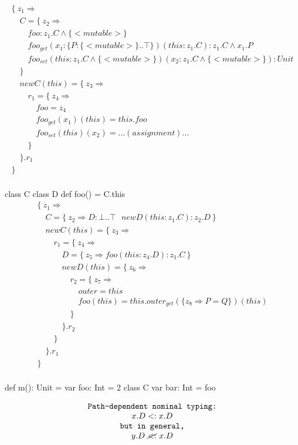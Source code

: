 \begin{equation*}
\begin{array}{l}
\{\ z_1 \Rightarrow \\
\quad C = \{\ z_2 \Rightarrow \\
\quad \quad foo: z_1.C \land \{<mutable>\} \\
\quad \quad foo_{get}(x_1: \{ P: \{<mutable>\}..\top \})(this: z_1.C): z_1.C \land x_1.P \\
\quad \quad foo_{set}(this: z_1.C \land \{<mutable>\})(x_2: z_1.C \land \{<mutable>\}): Unit \\
\quad \} \\
\quad newC(this) = \{\ z_3 \Rightarrow \\
\quad \quad r_1 = \{\ z_4 \Rightarrow \\
\quad \quad \quad foo = z_4 \\
\quad \quad \quad foo_{get}(x_1)(this) = this.foo \\
\quad \quad \quad foo_{set}(this)(x_2) = ...(assignment)... \\
\quad \quad \} \\
\quad \}.r_1 \\
\} \\
\end{array}
\end{equation*}



class C {
  class D { def foo() = C.this }
}
\begin{equation*}
\begin{array}{l}
\{\ z_1 \Rightarrow \\
\quad C = \{\ z_2 \Rightarrow D:\bot..\top \ \ \ newD(this:z_1.C): z_2.D\ \} \\
\quad newC(this) = \{\ z_3 \Rightarrow \\
\quad \quad r_1 = \{\ z_4 \Rightarrow \\
\quad \quad \quad D = \{\ z_5 \Rightarrow foo(this:z_4.D):z_1.C \ \} \\
\quad \quad \quad newD(this) = \{\ z_6 \Rightarrow \\
\quad \quad \quad \quad r_2 = \{\ z_7 \Rightarrow \\
\quad \quad \quad \quad \quad outer = this \\
\quad \quad \quad \quad \quad foo(this) = this.outer_{get}(\{z_8 \Rightarrow P=Q\})(this) \\
\quad \quad \quad \quad \} \\
\quad \quad \quad \}.r_2 \\
\quad \quad \} \\
\quad \}.r_1 \\
\} \\
\end{array}
\end{equation*}


def m(): Unit = {
  var foo: Int = 2
  class C { var bar: Int = foo }
}




\begin{equation*}
\begin{array}{c}
\texttt{Path-dependent nominal typing:} \\
x.D <: x.D \\
\texttt{but in general,} \\
y.D\ \cancel{<:}\ x.D \\
\end{array}
\end{equation*}

